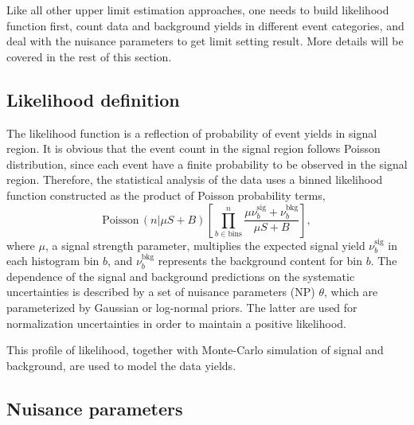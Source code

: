 \par Like all other upper limit estimation approaches, one needs to build likelihood function first, count data and background yields in different event categories, and deal with the nuisance parameters to get limit setting result. 
More details will be covered in the rest of this section.

\subsection{Likelihood definition}

\par The likelihood function is a reflection of probability of event yields in signal region. 
It is obvious that the event count in the signal region follows Poisson distribution, since each event have a finite probability to be observed in the signal region.
Therefore, the statistical analysis of the data uses a binned likelihood function constructed as the product of Poisson probability terms,
\begin{equation}
\mathrm{Poisson}\,(n|\mu S+B)\left[ \prod_{b\in \text{bins}}^{n} \frac{\mu \nu^{\mathrm{sig}}_{b}+\nu^{\mathrm{bkg}}_{b}}{\mu S+B} \right],
\end{equation}
where $\mu$, a signal strength parameter, multiplies the expected signal yield $\nu^{\mathrm{sig}}_b$ in each histogram bin $b$, and $\nu^{\mathrm{bkg}}_b$ represents the background content for bin $b$. 
The dependence of the signal and background predictions on the systematic uncertainties is described by a set of nuisance parameters (NP) $\theta$, which are parameterized by Gaussian or log-normal priors. 
The latter are used for normalization uncertainties in order to maintain a positive likelihood.

\par This profile of likelihood, together with Monte-Carlo simulation of signal and background, are used to model the data yields.

\subsection{Nuisance parameters}


